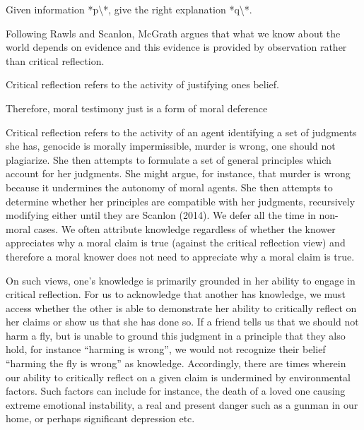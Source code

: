 \documentclass[12pt]{book}
\theoremstyle{definition}
\theoremstyle{remark}
\newcommand{\NormalTok}[1]{#1}
\newenvironment{Shaded}{}{}
\newenvironment{Highlighting}{}{}
\begin{document}
\begin{Shaded}
\begin{Highlighting}[]

\NormalTok{Given information *p\textbackslash{}\textquotesingle{}*, give the right explanation *q\textbackslash{}\textquotesingle{}*.}
\end{Highlighting}
\end{Shaded}

Following Rawls and Scanlon, McGrath argues that what we know about the world depends on evidence and this evidence is provided by observation rather than critical reflection.

\begin{Shaded}
\begin{Highlighting}[]

\NormalTok{Critical reflection refers to the activity of justifying one\textquotesingle{}s belief.}
\end{Highlighting}
\end{Shaded}

\begin{Shaded}
\begin{Highlighting}[]

\NormalTok{Therefore, moral testimony just is a form of moral deference}
\end{Highlighting}
\end{Shaded}

Critical reflection refers to the activity of an agent identifying a set of judgments she has, genocide is morally impermissible, murder is wrong, one should not plagiarize. She then attempts to formulate a set of general principles which account for her judgments. She might argue, for instance, that murder is wrong because it undermines the autonomy of moral agents. She then attempts to determine whether her principles are compatible with her judgments, recursively modifying either until they are Scanlon (2014). We defer all the time in non-moral cases. We often attribute knowledge regardless of whether the knower appreciates why a moral claim is true (against the critical reflection view) and therefore a moral knower does not need to appreciate why a moral claim is true.

On such views, one's knowledge is primarily grounded in her ability to engage in critical reflection. For us to acknowledge that another has knowledge, we must access whether the other is able to demonstrate her ability to critically reflect on her claims or show us that she has done so. If a friend tells us that we should not harm a fly, but is unable to ground this judgment in a principle that they also hold, for instance ``harming is wrong'', we would not recognize their belief ``harming the fly is wrong'' as knowledge. Accordingly, there are times wherein our ability to critically reflect on a given claim is undermined by environmental factors. Such factors can include for instance, the death of a loved one causing extreme emotional instability, a real and present danger such as a gunman in our home, or perhaps significant depression etc.
\end{document}

